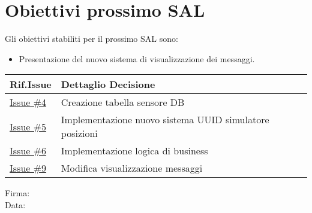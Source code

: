 \documentclass[10pt]{article}
\begin{document}
\section{Obiettivi prossimo SAL}
Gli obiettivi stabiliti per il prossimo SAL sono:
    \begin{itemize}
            \item Presentazione del nuovo sistema di visualizzazione dei messaggi.
    \end{itemize}
    \begin{center}
    \begin{tabular}{|>{\centering\arraybackslash}m{3cm}|>{\centering\arraybackslash}m{12cm}|}
	\hline
	\textbf{Rif.Issue} & \textbf{Dettaglio Decisione}\\
        \hline
            \href{https://github.com/SevenBitsSwe/MVP/issues/4}{Issue \#4} & Creazione tabella sensore DB \\
        \hline
            \href{https://github.com/SevenBitsSwe/MVP/issues/5}{Issue \#5} & Implementazione nuovo sistema UUID simulatore posizioni \\
        \hline
            \href{https://github.com/SevenBitsSwe/MVP/issues/6}{Issue \#6} & Implementazione logica di business\\
        \hline
            \href{https://github.com/SevenBitsSwe/MVP/issues/9}{Issue \#9} & Modifica visualizzazione messaggi\\
        \hline
    \end{tabular}
    \end{center}

\vfill
\begin{minipage}{10cm}
Firma: \hrulefill \\
\vspace{2mm}
Data: \dotfill
\end{minipage}
\end{document}
